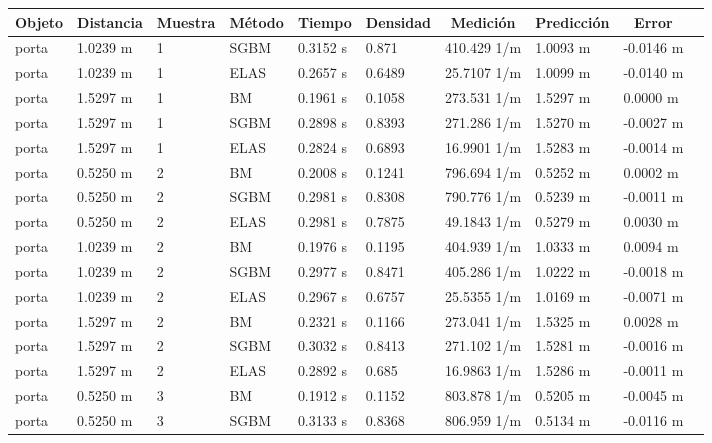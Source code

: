 \documentclass[11pt,a4paper,titlepage]{article}
\begin{document}
\begin{table}[!ht]
\small
\centering
\hspace*{-2cm}
\begin{tabular}{@{}llllllllll@{}}
\multicolumn{1}{c}{Objeto} & \multicolumn{1}{c}{Distancia} & \multicolumn{1}{c}{Muestra} & \multicolumn{1}{c}{Método} & \multicolumn{1}{c}{Tiempo} & \multicolumn{1}{c}{Densidad} & \multicolumn{1}{c}{Medición} & \multicolumn{1}{c}{Predicción} & \multicolumn{1}{c}{Error} \\ \midrule
porta & 1.0239 m & 1 & SGBM & 0.3152 s & 0.871 & 410.429 1/m & 1.0093 m & -0.0146 m \\ \midrule
porta & 1.0239 m & 1 & ELAS & 0.2657 s & 0.6489 & 25.7107 1/m & 1.0099 m & -0.0140 m \\ \midrule
porta & 1.5297 m & 1 & BM & 0.1961 s & 0.1058 & 273.531 1/m & 1.5297 m & 0.0000 m \\ \midrule
porta & 1.5297 m & 1 & SGBM & 0.2898 s & 0.8393 & 271.286 1/m & 1.5270 m & -0.0027 m \\ \midrule
porta & 1.5297 m & 1 & ELAS & 0.2824 s & 0.6893 & 16.9901 1/m & 1.5283 m & -0.0014 m \\ \midrule
porta & 0.5250 m & 2 & BM & 0.2008 s & 0.1241 & 796.694 1/m & 0.5252 m & 0.0002 m \\ \midrule
porta & 0.5250 m & 2 & SGBM & 0.2981 s & 0.8308 & 790.776 1/m & 0.5239 m & -0.0011 m \\ \midrule
porta & 0.5250 m & 2 & ELAS & 0.2981 s & 0.7875 & 49.1843 1/m & 0.5279 m & 0.0030 m \\ \midrule
porta & 1.0239 m & 2 & BM & 0.1976 s & 0.1195 & 404.939 1/m & 1.0333 m & 0.0094 m \\ \midrule
porta & 1.0239 m & 2 & SGBM & 0.2977 s & 0.8471 & 405.286 1/m & 1.0222 m & -0.0018 m \\ \midrule
porta & 1.0239 m & 2 & ELAS & 0.2967 s & 0.6757 & 25.5355 1/m & 1.0169 m & -0.0071 m \\ \midrule
porta & 1.5297 m & 2 & BM & 0.2321 s & 0.1166 & 273.041 1/m & 1.5325 m & 0.0028 m \\ \midrule
porta & 1.5297 m & 2 & SGBM & 0.3032 s & 0.8413 & 271.102 1/m & 1.5281 m & -0.0016 m \\ \midrule
porta & 1.5297 m & 2 & ELAS & 0.2892 s & 0.685 & 16.9863 1/m & 1.5286 m & -0.0011 m \\ \midrule
porta & 0.5250 m & 3 & BM & 0.1912 s & 0.1152 & 803.878 1/m & 0.5205 m & -0.0045 m \\ \midrule
porta & 0.5250 m & 3 & SGBM & 0.3133 s & 0.8368 & 806.959 1/m & 0.5134 m & -0.0116 m \\ \midrule

\end{tabular}
\end{table}
\end{document}
